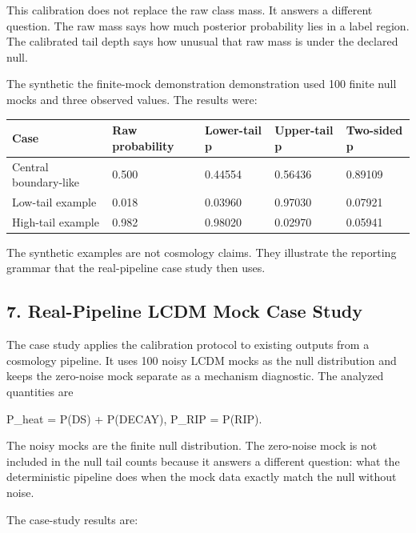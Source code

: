 \documentclass[
]{article}
\newenvironment{Shaded}{}{}
\newcommand{\NormalTok}[1]{#1}
\newcounter{none} %
\begin{document}
This calibration does not replace the raw class mass. It answers a
different question. The raw mass says how much posterior probability
lies in a label region. The calibrated tail depth says how unusual that
raw mass is under the declared null.

The synthetic the finite-mock demonstration demonstration used 100
finite null mocks and three observed values. The results were:

{\def\LTcaptype{none} %
\begin{longtable}[]{@{}lllll@{}}
\toprule\noalign{}
Case & Raw probability & Lower-tail p & Upper-tail p & Two-sided p \\
\midrule\noalign{}
\endhead
\bottomrule\noalign{}
\endlastfoot
Central boundary-like & 0.500 & 0.44554 & 0.56436 & 0.89109 \\
Low-tail example & 0.018 & 0.03960 & 0.97030 & 0.07921 \\
High-tail example & 0.982 & 0.98020 & 0.02970 & 0.05941 \\
\end{longtable}
}

The synthetic examples are not cosmology claims. They illustrate the
reporting grammar that the real-pipeline case study then uses.

\subsection{7. Real-Pipeline LCDM Mock Case
Study}\label{real-pipeline-lcdm-mock-case-study}

The case study applies the calibration protocol to existing outputs from
a cosmology pipeline. It uses 100 noisy LCDM mocks as the null
distribution and keeps the zero-noise mock separate as a mechanism
diagnostic. The analyzed quantities are

\begin{Shaded}
\begin{Highlighting}[]
\NormalTok{P\_heat = P(DS) + P(DECAY),}
\NormalTok{P\_RIP  = P(RIP).}
\end{Highlighting}
\end{Shaded}

The noisy mocks are the finite null distribution. The zero-noise mock is
not included in the null tail counts because it answers a different
question: what the deterministic pipeline does when the mock data
exactly match the null without noise.

The case-study results are:
\end{document}

